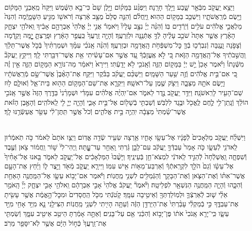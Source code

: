 \documentclass[twoside, openany, parskip=half, 11pt]{book}
\begin{document}
\begin{sometimes}
\begin{footnotesize}
\begin{multicols}{2}
\\
וַיֵּצֵ֥א יַֽעֲקֹ֖ב מִבְּֿאֵ֣ר שָׁ֑בַע וַיֵּ֖לֶךְ חָרָֽנָה׃ וַיִּפְגַּ֨ע בַּמָּק֜וֹם וַיָּ֤לֶן שָׁם֙ כִּי־בָ֣א הַשֶּׁ֔מֶשׁ וַיִּקַּח֙ מֵֽאַבְנֵ֣י הַמָּק֔וֹם וַיָּ֖שֶׂם מְֿרַֽאֲשֹׁתָ֑יו וַיִּשְׁכַּ֖ב בַּמָּק֥וֹם הַהֽוּא׃ וַֽיַּֽחֲלֹ֗ם וְֿהִנֵּ֤ה סֻלָּם֙ מֻצָּ֣ב אַ֔רְצָה וְֿרֹאשׁ֖וֹ מַגִּ֣יעַ הַשָּׁמָ֑יְֿמָה וְֿהִנֵּה֙ מַלְאֲכֵ֣י אֱלֹהִ֔ים עֹלִ֥ים וְֿיֹֽרְֿדִ֖ים בּֽוֹ׃  וְֿהִנֵּ֨ה יְיָ֜ נִצָּ֣ב עָלָיו֘ וַיֹּאמַר֒ אֲנִ֣י יְיָ֗ אֱלֹהֵי֙ אַבְרָהָ֣ם אָבִ֔יךָ וֵֽאלֹהֵ֖י יִצְחָ֑ק הָאָ֗רֶץ אֲשֶׁ֤ר אַתָּה֙ שֹׁכֵ֣ב עָלֶ֔יהָ לְֿךָ֥ אֶתְּֿנֶ֖נָּה וּלְזַרְעֶֽךָ׃ וְֿהָיָ֤ה זַֽרְעֲךָ֙ כַּֽעֲפַ֣ר הָאָ֔רֶץ וּפָֽרַצְתָּ֛ יׇׇׇׇׇׇָ֥מָּה וָקֵ֖דְֿמָה וְֿצָפֹ֣נָה וָנֶ֑גְבָּה וְֿנִבְרְֿכ֥וּ בְֿךָ֛ כׇּל־מִשְׁפְּֿחֹ֥ת הָֽאֲדָמָ֖ה וּבְזַרְעֶֽךָ׃ וְֿהִנֵּ֨ה אָֽנֹכִ֜י עִמָּ֗ךְ וּשְׁמַרְתִּ֨יךָ֙ בְּֿכֹ֣ל אֲשֶׁר־תֵּלֵ֔ךְ וַֽהֲשִׁ֣בֹתִ֔יךָ אֶל־הָֽאֲדָמָ֖ה הַזֹּ֑את כִּ֚י לֹ֣א אֶֽעֱזָבְֿךָ֔ עַ֚ד אֲשֶׁ֣ר אִם־עָשִׂ֔יתִי אֵ֥ת אֲשֶׁר־דִּבַּ֖רְתִּי לָֽךְ׃ וַיִּיקַ֣ץ יַֽעֲקֹב֘ מִשְּֿׁנָתוֹ֒ וַיֹּ֗אמֶר אָכֵן֙ יֵ֣שׁ יְיָ֔ בַּמָּק֖וֹם הַזֶּ֑ה וְֿאָֽנֹכִ֖י לֹ֥א יָדָֽעְֿתִּי׃ וַיִּירָא֙ וַיֹּאמַ֔ר מַה־נּוֹרָ֖א הַמָּק֣וֹם הַזֶּ֑ה אֵ֣ין זֶ֗ה כִּ֚י אִם־בֵּ֣ית אֱלֹהִ֔ים וְֿזֶ֖ה שַׁ֥עַר הַשָּׁמָֽיִם׃  וַיַּשְׁכֵּ֨ם יַֽעֲקֹ֜ב בַּבֹּ֗קֶר וַיִּקַּ֤ח אֶת־הָאֶ֨בֶן֙ אֲשֶׁר־שָׂ֣ם מְֿרַֽאֲשֹׁתָ֔יו וַיָּ֥שֶׂם אֹתָ֖הּ מַצֵּבָ֑ה וַיִּצֹ֥ק שֶׁ֖מֶן עַל־רֹאשָֽׁהּ׃ וַיִּקְרָ֛א אֶת־שֵׁם־הַמָּק֥וֹם הַה֖וּא בֵּית־אֵ֑ל וְֿאוּלָ֛ם ל֥וּז שֵׁם־הָעִ֖יר לָרִֽאשֹׁנָֽה׃ וַיִּדַּ֥ר יַֽעֲקֹ֖ב נֶ֣דֶר לֵאמֹ֑ר אִם־יִֽהְיֶ֨ה אֱלֹהִ֜ים עִמָּדִ֗י וּשְׁמָרַ֨נִי֙ בַּדֶּ֤רֶךְ הַזֶּה֙ אֲשֶׁ֣ר אָֽנֹכִ֣י הוֹלֵ֔ךְ וְֿנָֽתַן־לִ֥י לֶ֛חֶם לֶֽאֱכֹ֖ל וּבֶ֥גֶד לִלְבֹּֽשׁ׃ וְֿשַׁבְתִּ֥י בְֿשָׁל֖וֹם אֶל־בֵּ֣ית אָבִ֑י וְֿהָיָ֧ה יְיָ֛ לִ֖י לֵֽאלֹהִֽים׃ וְֿהָאֶ֣בֶן הַזֹּ֗את אֲשֶׁר־שַׂ֨מְתִּי֙ מַצֵּבָ֔ה יִֽהְיֶ֖ה בֵּ֣ית אֱלֹהִ֑ים וְֿכֹל֙ אֲשֶׁ֣ר תִּֽתֶּן־לִ֔י עַשֵּׂ֖ר אֲעַשְּֿׂרֶ֥נּוּ לָֽךְ׃

\\
וַיִּשְׁלַ֨ח יַֽעֲקֹ֤ב מַלְאָכִים֙ לְֿפָנָ֔יו אֶל־עֵשָׂ֖ו אָחִ֑יו אַ֥רְצָה שֵׂעִ֖יר שְֿׂדֵ֥ה אֱדֽוֹם׃ וַיְצַ֤ו אֹתָם֙ לֵאמֹ֔ר כֹּ֣ה תֹֽאמְֿר֔וּן לַֽאדֹנִ֖י לְֿעֵשָׂ֑ו כֹּ֤ה אָמַר֙ עַבְדְּֿךָ֣ יַֽעֲקֹ֔ב עִם־לָבָ֣ן גַּ֔רְתִּי וָֽאֵחַ֖ר עַד־עׇׇׇׇׇׇׇׇָֽתָּה׃ וַֽיְהִי־לִי֙ שׁ֣וֹר וַֽחֲמ֔וֹר צֹ֖אן וְֿעֶ֣בֶד וְֿשִׁפְחָ֑ה וָֽאֶשְׁלְֿחָה֙ לְֿהַגִּ֣יד לַֽאדֹנִ֔י לִמְצֹא־חֵ֖ן בְּֿעֵינֶֽיךָ׃  וַיָּשֻׁ֨בוּ֙ הַמַּלְאָכִ֔ים אֶל־יַֽעֲקֹ֖ב לֵאמֹ֑ר בָּ֤אנוּ אֶל־אָחִ֨יךָ֙ אֶל־עֵשָׂ֔ו וְֿגַם֙ הֹלֵ֣ךְ לִקְרָֽאתְֿךָ֔ וְֿאַרְבַּע־מֵא֥וֹת אִ֖ישׁ עִמּֽוֹ׃ וַיִּירָ֧א יַֽעֲקֹ֛ב מְֿאֹ֖ד וַיֵּ֣צֶר ל֑וֹ וַיַּ֜חַץ אֶת־הָעָ֣ם אֲשֶׁר־אִתּ֗וֹ וְֿאֶת־הַצֹּ֧אן וְֿאֶת־הַבָּקָ֛ר וְֿהַגְּֿמַלִּ֖ים לִשְׁנֵ֥י מַֽחֲנֽוֹת׃ וַיֹּ֕אמֶר אִם־יָב֥וֹא עֵשָׂ֛ו אֶל־הַמַּֽחֲנֶ֥ה הָאַחַ֖ת וְֿהִכָּ֑הוּ וְֿהָיָ֛ה הַמַּֽחֲנֶ֥ה הַנִּשְׁאָ֖ר לִפְלֵיטָֽה׃  וַיֹּ֘אמֶר֘ יַֽעֲקֹב֒ אֱלֹהֵי֙ אָבִ֣י אַבְרָהָ֔ם וֵֽאלֹהֵ֖י אָבִ֣י יִצְחָ֑ק יְיָ֞ הָֽאֹמֵ֣ר אֵלַ֗י שׁ֧וּב לְֿאַרְצְֿךָ֛ וּלְמֽוֹלַדְתְּךָ֖ וְֿאֵיטִ֥יבָה עִמָּֽךְ׃ קָטֹ֝נְֿתִּי מִכֹּ֤ל הַֽחֲסָדִים֙ וּמִכׇּל־הָ֣אֱמֶ֔ת אֲשֶׁ֥ר עָשִׂ֖יתָ אֶת־עַבְדֶּ֑ךָ כִּ֣י בְֿמַקְלִ֗י עָבַ֨רְתִּי֙ אֶת־הַיַּרְדֵּ֣ן הַזֶּ֔ה וְֿעַתָּ֥ה הָיִ֖יתִי לִשְׁנֵ֥י מַֽחֲנֽוֹת׃ הַצִּילֵ֥נִי נָ֛א מִיַּ֥ד אָחִ֖י מִיַּ֣ד עֵשָׂ֑ו כִּֽי־יָרֵ֤א אָֽנֹכִי֙ אֹת֔וֹ פֶּן־יָב֣וֹא וְֿהִכַּ֔נִי אֵ֖ם עַל־בָּנִֽים׃ וְֿאַתָּ֣ה אָמַ֔רְתָּ הֵיטֵ֥ב אֵיטִ֖יב עִמָּ֑ךְ וְֿשַׂמְתִּ֤י אֶת־זַֽרְעֲךָ֙ כְּֿח֣וֹל הַיָּ֔ם אֲשֶׁ֥ר לֹֽא־יִסָּפֵ֖ר מֵרֹֽב׃



\end{multicols}
\end{footnotesize}
\end{sometimes}
\end{document}
